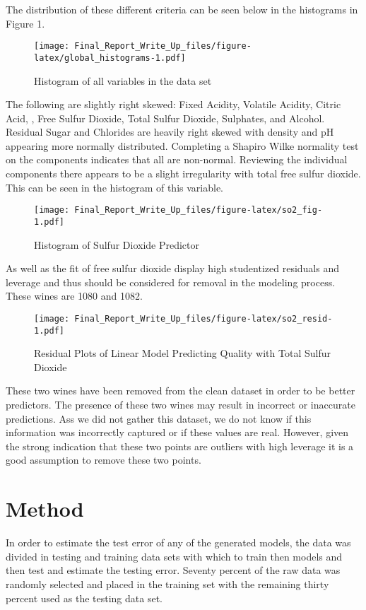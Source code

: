 \documentclass[]{article}
\begin{document}
The distribution of these different criteria can be seen below in the
histograms in Figure 1.

\begin{figure}[htbp]
\centering
\texttt{[image: Final\_Report\_Write\_Up\_files/figure-latex/global\_histograms-1.pdf]}
\caption{Histogram of all variables in the data set}
\end{figure}

The following are slightly right skewed: Fixed Acidity, Volatile
Acidity, Citric Acid, , Free Sulfur Dioxide, Total Sulfur Dioxide,
Sulphates, and Alcohol. Residual Sugar and Chlorides are heavily right
skewed with density and pH appearing more normally distributed.
Completing a Shapiro Wilke normality test on the components indicates
that all are non-normal. Reviewing the individual components there
appears to be a slight irregularity with total free sulfur dioxide. This
can be seen in the histogram of this variable.

\begin{figure}[htbp]
\centering
\texttt{[image: Final\_Report\_Write\_Up\_files/figure-latex/so2\_fig-1.pdf]}
\caption{Histogram of Sulfur Dioxide Predictor}
\end{figure}

As well as the fit of free sulfur dioxide display high studentized
residuals and leverage and thus should be considered for removal in the
modeling process. These wines are 1080 and 1082.

\begin{figure}[htbp]
\centering
\texttt{[image: Final\_Report\_Write\_Up\_files/figure-latex/so2\_resid-1.pdf]}
\caption{Residual Plots of Linear Model Predicting Quality with Total
Sulfur Dioxide}
\end{figure}

These two wines have been removed from the clean dataset in order to be
better predictors. The presence of these two wines may result in
incorrect or inaccurate predictions. Ass we did not gather this dataset,
we do not know if this information was incorrectly captured or if these
values are real. However, given the strong indication that these two
points are outliers with high leverage it is a good assumption to remove
these two points.

\section{Method}\label{method}

In order to estimate the test error of any of the generated models, the
data was divided in testing and training data sets with which to train
then models and then test and estimate the testing error. Seventy
percent of the raw data was randomly selected and placed in the training
set with the remaining thirty percent used as the testing data set.
\end{document}
